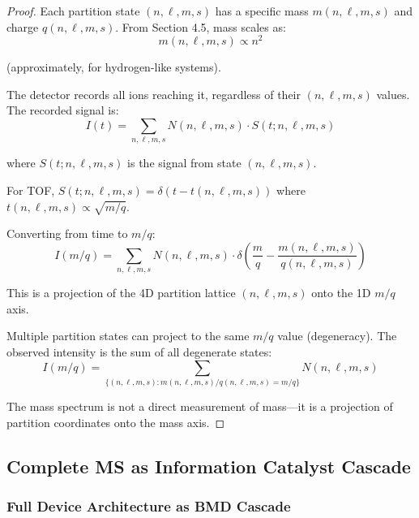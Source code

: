 \begin{proof}
Each partition state $(n,\ell,m,s)$ has a specific mass $m(n,\ell,m,s)$ and charge $q(n,\ell,m,s)$. From Section 4.5, mass scales as:
\begin{equation}
m(n,\ell,m,s) \propto n^2
\end{equation}

(approximately, for hydrogen-like systems).

The detector records all ions reaching it, regardless of their $(n,\ell,m,s)$ values. The recorded signal is:
\begin{equation}
I(t) = \sum_{n,\ell,m,s} N(n,\ell,m,s) \cdot S(t; n,\ell,m,s)
\end{equation}

where $S(t; n,\ell,m,s)$ is the signal from state $(n,\ell,m,s)$.

For TOF, $S(t; n,\ell,m,s) = \delta(t - t(n,\ell,m,s))$ where $t(n,\ell,m,s) \propto \sqrt{m/q}$.

Converting from time to $m/q$:
\begin{equation}
I(m/q) = \sum_{n,\ell,m,s} N(n,\ell,m,s) \cdot \delta\left(\frac{m}{q} - \frac{m(n,\ell,m,s)}{q(n,\ell,m,s)}\right)
\end{equation}

This is a projection of the 4D partition lattice $(n,\ell,m,s)$ onto the 1D $m/q$ axis.

Multiple partition states can project to the same $m/q$ value (degeneracy). The observed intensity is the sum of all degenerate states:
\begin{equation}
I(m/q) = \sum_{\{(n,\ell,m,s) : m(n,\ell,m,s)/q(n,\ell,m,s) = m/q\}} N(n,\ell,m,s)
\end{equation}

The mass spectrum is not a direct measurement of mass—it is a projection of partition coordinates onto the mass axis.
\end{proof}

\subsection{Complete MS as Information Catalyst Cascade}

\subsubsection{Full Device Architecture as BMD Cascade}

